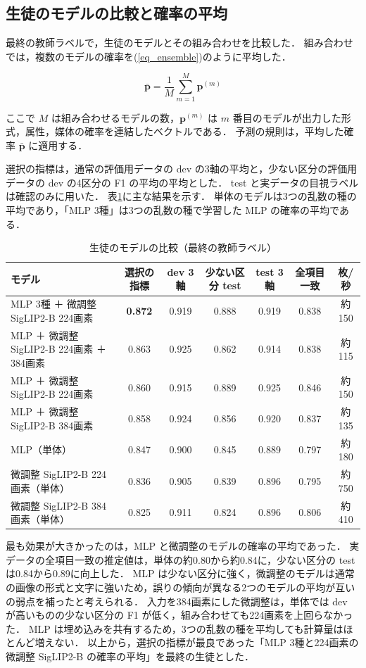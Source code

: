 \subsection{生徒のモデルの比較と確率の平均}
最終の教師ラベルで，生徒のモデルとその組み合わせを比較した．
組み合わせでは，複数のモデルの確率を(\ref{eq_ensemble})のように平均した．

\begin{equation}
    \bar{\mathbf p} = \frac{1}{M} \sum_{m=1}^{M} {\mathbf p}^{(m)}
    \label{eq_ensemble}
\end{equation}

\noindent
ここで $ M $ は組み合わせるモデルの数，$ {\mathbf p}^{(m)} $ は $ m $ 番目のモデルが出力した形式，属性，媒体の確率を連結したベクトルである．
予測の規則は，平均した確率 $ \bar{\mathbf p} $ に適用する．

選択の指標は，通常の評価用データの dev の3軸の平均と，少ない区分の評価用データの dev の4区分の F1 の平均の平均とした．
test と実データの目視ラベルは確認のみに用いた．
表\ref{tab_student_models}に主な結果を示す．
単体のモデルは3つの乱数の種の平均であり，「MLP 3種」は3つの乱数の種で学習した MLP の確率の平均である．

\begin{table}[t]
    \centering
    \caption{生徒のモデルの比較（最終の教師ラベル）}
    \label{tab_student_models}
    \footnotesize
    \begin{tabular}{lcccccc}
        \toprule
        モデル & 選択の指標 & dev 3軸 & 少ない区分 test & test 3軸 & 全項目一致 & 枚/秒 \\
        \midrule
        MLP 3種 ＋ 微調整 SigLIP2-B 224画素 & {\bf 0.872} & 0.919 & 0.888 & 0.919 & 0.838 & 約150 \\
        MLP ＋ 微調整 SigLIP2-B 224画素 ＋ 384画素 & 0.863 & 0.925 & 0.862 & 0.914 & 0.838 & 約115 \\
        MLP ＋ 微調整 SigLIP2-B 224画素 & 0.860 & 0.915 & 0.889 & 0.925 & 0.846 & 約150 \\
        MLP ＋ 微調整 SigLIP2-B 384画素 & 0.858 & 0.924 & 0.856 & 0.920 & 0.837 & 約135 \\
        MLP（単体） & 0.847 & 0.900 & 0.845 & 0.889 & 0.797 & 約180 \\
        微調整 SigLIP2-B 224画素（単体） & 0.836 & 0.905 & 0.839 & 0.896 & 0.795 & 約750 \\
        微調整 SigLIP2-B 384画素（単体） & 0.825 & 0.911 & 0.824 & 0.896 & 0.806 & 約410 \\
        \bottomrule
    \end{tabular}
\end{table}

最も効果が大きかったのは，MLP と微調整のモデルの確率の平均であった．
実データの全項目一致の推定値は，単体の約0.80から約0.84に，少ない区分の test は0.84から0.89に向上した．
MLP は少ない区分に強く，微調整のモデルは通常の画像の形式と文字に強いため，誤りの傾向が異なる2つのモデルの平均が互いの弱点を補ったと考えられる．
入力を384画素にした微調整は，単体では dev が高いものの少ない区分の F1 が低く，組み合わせても224画素を上回らなかった．
MLP は埋め込みを共有するため，3つの乱数の種を平均しても計算量はほとんど増えない．
以上から，選択の指標が最良であった「MLP 3種と224画素の微調整 SigLIP2-B の確率の平均」を最終の生徒とした．
